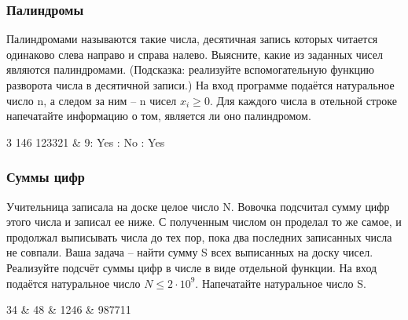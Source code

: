 \begin{frame}
	\frametitle{Палиндромы}
Палиндромами называются такие числа, десятичная запись которых читается
	одинаково слева направо и справа налево. Выясните, какие из заданных чисел
	являются палиндромами. (Подсказка: реализуйте вспомогательную функцию
	разворота числа в десятичной записи.)
	\inp
	На вход программе подаётся натуральное число n, а следом за ним -- n чисел
	$x_i \geq 0$.
	\out
	Для каждого числа в отельной строке напечатайте информацию о том, является ли
	оно палиндромом.
	\begin{ex}
		3  146 123321 & 9: Yes : No : Yes \tb
	\end{ex}
\end{frame}

\begin{frame}
	\frametitle{Суммы цифр}
	Учительница записала на доске целое число N. Вовочка подсчитал сумму цифр этого
	числа и записал ее ниже. С полученным числом он проделал то же самое, и
	продолжал выписывать числа до тех пор, пока два последних записанных числа не
	совпали. Ваша задача -- найти сумму S всех выписанных на доску чисел. Реализуйте
	подсчёт суммы цифр в числе в виде отдельной функции.
	\inp
	На вход подаётся натуральное число $N \leq 2\cdot 10^9$.
	\out
	Напечатайте натуральное число S.
	\begin{ex}
		34 & 48  & 1246  & 987711 \tb
	\end{ex}
\end{frame}


